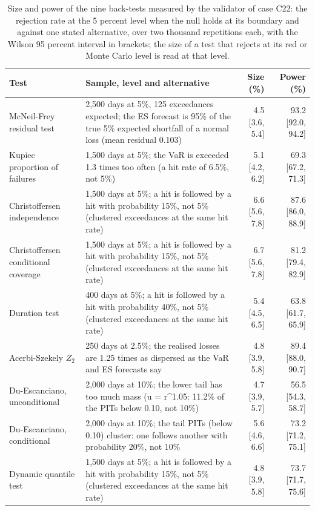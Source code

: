 \begin{table}[htbp]
\centering
\scriptsize
\setlength{\tabcolsep}{2.5pt}
\caption{Size and power of the nine back-tests measured by the validator of case C22: the rejection rate at the 5 percent level when the null holds at its boundary and against one stated alternative, over two thousand repetitions each, with the Wilson 95 percent interval in brackets; the size of a test that rejects at its red or Monte Carlo level is read at that level.}
\label{tab:market-sizepower}
\begin{tabular}{p{2.9cm}p{6.6cm}rr}
\toprule
Test & Sample, level and alternative & Size (\%) & Power (\%) \\
\midrule
\relax McNeil-Frey residual test & 2,500 days at 5\%, 125 exceedances expected; the ES forecast is 95\% of the true 5\% expected shortfall of a normal loss (mean residual 0.103) & 4.5 [3.6, 5.4] & 93.2 [92.0, 94.2] \\
\relax Kupiec proportion of failures & 1,500 days at 5\%; the VaR is exceeded 1.3 times too often (a hit rate of 6.5\%, not 5\%) & 5.1 [4.2, 6.2] & 69.3 [67.2, 71.3] \\
\relax Christoffersen independence & 1,500 days at 5\%; a hit is followed by a hit with probability 15\%, not 5\% (clustered exceedances at the same hit rate) & 6.6 [5.6, 7.8] & 87.6 [86.0, 88.9] \\
\relax Christoffersen conditional coverage & 1,500 days at 5\%; a hit is followed by a hit with probability 15\%, not 5\% (clustered exceedances at the same hit rate) & 6.7 [5.6, 7.8] & 81.2 [79.4, 82.9] \\
\relax Duration test & 400 days at 5\%; a hit is followed by a hit with probability 40\%, not 5\% (clustered exceedances at the same hit rate) & 5.4 [4.5, 6.5] & 63.8 [61.7, 65.9] \\
\relax Acerbi-Szekely $Z_2$ & 250 days at 2.5\%; the realised losses are 1.25 times as dispersed as the VaR and ES forecasts say & 4.8 [3.9, 5.8] & 89.4 [88.0, 90.7] \\
\relax Du-Escanciano, unconditional & 2,000 days at 10\%; the lower tail has too much mass (u = r\textasciicircum{}1.05: 11.2\% of the PITs below 0.10, not 10\%) & 4.7 [3.9, 5.7] & 56.5 [54.3, 58.7] \\
\relax Du-Escanciano, conditional & 2,000 days at 10\%; the tail PITs (below 0.10) cluster: one follows another with probability 20\%, not 10\% & 5.6 [4.6, 6.6] & 73.2 [71.2, 75.1] \\
\relax Dynamic quantile test & 1,500 days at 5\%; a hit is followed by a hit with probability 15\%, not 5\% (clustered exceedances at the same hit rate) & 4.8 [3.9, 5.8] & 73.7 [71.7, 75.6] \\

\end{tabular}
\end{table}
